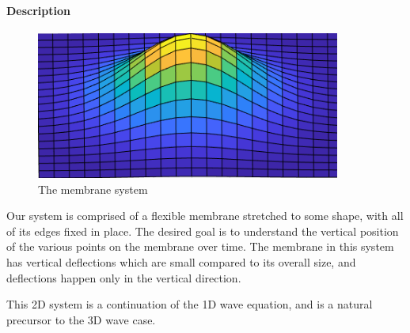 

\paragraph{Description}
\begin{figure}[htb]
	\centering
	\includegraphics[width=10cm]{Figures/2D_waves_system.png}       
	\caption{The membrane system }
	\label{2D_waves_system.fig}
\end{figure}

Our system is comprised of a flexible membrane stretched to some shape, with all of its edges fixed in place. The desired goal is to understand the vertical position of the various points on the membrane over time. The membrane in this system has vertical deflections which are small compared to its overall size, and deflections happen only in the vertical direction.

This 2D system is a continuation of the 1D wave equation, and is a natural precursor to the 3D wave case. 


